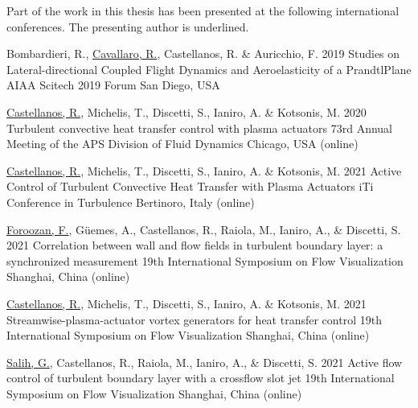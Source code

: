 Part of the work in this thesis has been presented at the following international conferences. The presenting author is underlined.

  \conferenceitem%
    {Bombardieri, R., \underline{Cavallaro, R.}, Castellanos, R. \& Auricchio, F.}%
    {2019}%
    {Studies on Lateral-directional Coupled Flight Dynamics and Aeroelasticity of a PrandtlPlane}%
    {AIAA Scitech 2019 Forum}%
    {San Diego, USA}%

  \conferenceitem%
    {\underline{Castellanos, R.}, Michelis, T., Discetti, S., Ianiro, A. \& Kotsonis, M.}%
    {2020}%
    {Turbulent convective heat transfer control with plasma actuators}%
    {73rd Annual Meeting of the APS Division of Fluid Dynamics}%
    {Chicago, USA (online)}%

  \conferenceitem%
    {\underline{Castellanos, R.}, Michelis, T., Discetti, S., Ianiro, A. \& Kotsonis, M.}%
    {2021}%
    {Active Control of Turbulent Convective Heat Transfer with Plasma Actuators}%
    {iTi Conference in Turbulence}%
    {Bertinoro, Italy (online)}%

	\conferenceitem%
		{\underline{Foroozan, F.}, Güemes, A., Castellanos, R., Raiola, M., Ianiro, A., \& Discetti, S.}%
		{2021}%
		{Correlation between wall and flow fields in turbulent boundary layer: a synchronized measurement}%
		{19th International Symposium on Flow Visualization}%
		{Shanghai, China (online)}%

	\conferenceitem%
		{\underline{Castellanos, R.}, Michelis, T., Discetti, S., Ianiro, A. \& Kotsonis, M.}%
		{2021}%
		{Streamwise-plasma-actuator vortex generators for heat transfer control}%
		{19th International Symposium on Flow Visualization}%
		{Shanghai, China (online)}%

	\conferenceitem%
		{\underline{Salih, G.}, Castellanos, R., Raiola, M., Ianiro, A., \& Discetti, S.}%
		{2021}%
		{Active flow control of turbulent boundary layer with a crossflow slot jet}%
		{19th International Symposium on Flow Visualization}%
		{Shanghai, China (online)}%

